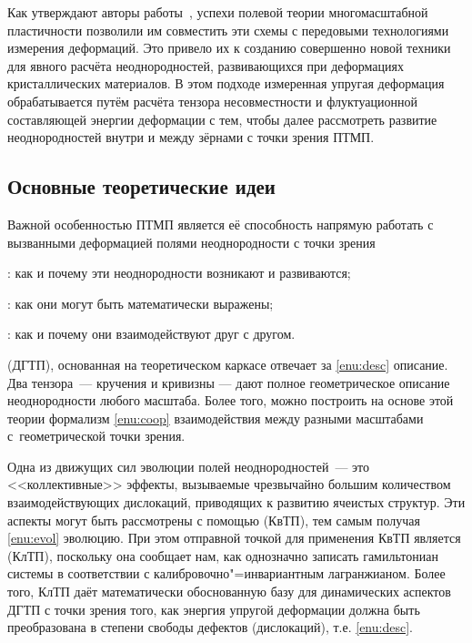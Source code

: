 \documentclass[a4paper, 14pt, titlepage]{extarticle}
\begin{document}
  Как утверждают авторы работы~\cite{hasebe-ftmp}, успехи полевой теории многомасштабной
  пластичности позволили им совместить эти схемы с передовыми технологиями измерения деформаций. Это
  привело их к созданию совершенно новой техники для явного расчёта неоднородностей, развивающихся
  при деформациях кристаллических материалов. В этом подходе измеренная упругая деформация
  обрабатывается путём расчёта тензора несовместности и флуктуационной составляющей энергии
  деформации с тем, чтобы далее рассмотреть развитие неоднородностей внутри и между зёрнами с точки
  зрения ПТМП.

  \subsection{Основные теоретические идеи}

  Важной особенностью ПТМП является её способность напрямую работать с вызванными деформацией полями
  неоднородности с точки зрения
  \begin{enumasbuk}
    \item {}: как и почему эти неоднородности возникают и развиваются; \label{enu:evol}
    \item {}: как они могут быть математически выражены; \label{enu:desc}
    \item {}: как и почему они взаимодействуют друг с другом. \label{enu:coop}
  \end{enumasbuk}

   (ДГТП), основанная на теоретическом каркасе
   отвечает за \ref{enu:desc} описание. Два тензора~--- кручения и
  кривизны --- дают полное геометрическое описание неоднородности любого масштаба. Более того, можно
  построить на основе этой теории формализм \ref{enu:coop} взаимодействия между разными масштабами
  с~геометрической точки зрения.

  Одна из движущих сил эволюции полей неоднородностей~--- это <<коллективные>> эффекты, вызываемые
  чрезвычайно большим количеством взаимодействующих дислокаций, приводящих к развитию ячеистых
  структур. Эти аспекты могут быть рассмотрены с помощью  (КвТП), тем
  самым получая \ref{enu:evol} эволюцию. При этом отправной точкой для применения КвТП является
   (КлТП), поскольку она сообщает нам, как однозначно записать
  гамильтониан системы в соответствии с калибровочно"=инвариантным лагранжианом. Более того, КлТП
  даёт математически обоснованную базу для динамических аспектов ДГТП с точки зрения того, как
  энергия упругой деформации должна быть преобразована в степени свободы дефектов (дислокаций), т.е. \ref{enu:desc}.
\end{document}
